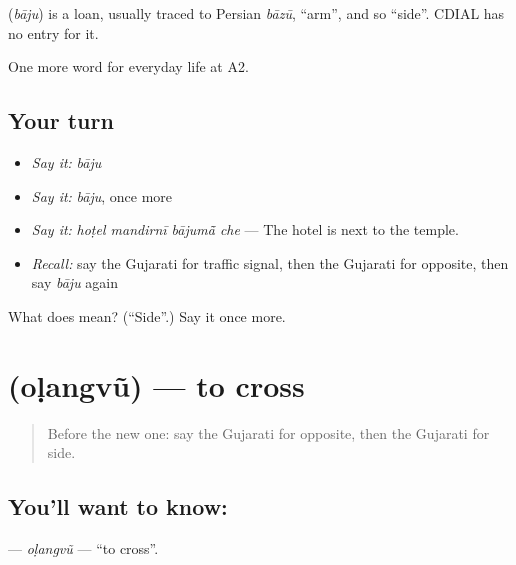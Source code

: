 \begin{cousinweb}
\textbf{} (\emph{bāju}) is a loan, usually traced to Persian \emph{bāzū}, \textquotedblleft{}arm\textquotedblright{}, and so \textquotedblleft{}side\textquotedblright{}. CDIAL has no entry for it.
\end{cousinweb}

\begin{grammarlens}[title={What you've built}]
One more word for everyday life at A2.
\end{grammarlens}

\subsection*{Your turn}
\begin{itemize}
\raggedright
  \item \emph{Say it:} \emph{bāju}
  \item \emph{Say it:} \emph{bāju}, once more
  \item \emph{Say it:} \emph{hoṭel mandirnī bājumā̃ che} — The hotel is next to the temple.
  \item \emph{Recall:} say the Gujarati for traffic signal, then the Gujarati for opposite, then say \emph{bāju} again
\end{itemize}

\begin{tcolorbox}[breakable,colback=teal!4,colframe=teal!35!black,title={Before you move on}]
What does  mean? (\textquotedblleft{}Side\textquotedblright{}.) Say it once more.
\end{tcolorbox}
\section[\texorpdfstring{\gu{ઓળંગવું} (oḷangvũ)}{ઓળંગવું (oḷangvũ)}]{ (oḷangvũ) — to cross}

\label{lesson:GU-C194-olangvu}



\begin{quote}
Before the new one: say the Gujarati for opposite, then the Gujarati for side.
\end{quote}

\subsection*{You'll want to know: }
\textbf{} — \emph{oḷangvũ} — \textquotedblleft{}to cross\textquotedblright{}.

